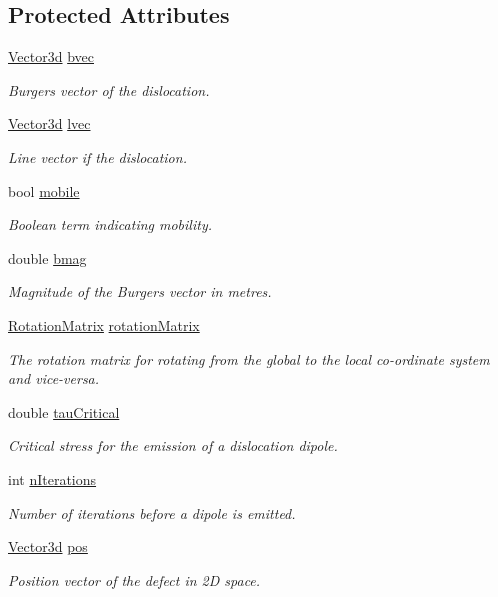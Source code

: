 \subsection*{Protected Attributes}
\begin{DoxyCompactItemize}
\item 
\hyperlink{classVector3d}{Vector3d} \hyperlink{classDislocationSource_ade4753ac6106317c693c2bba4f83a568}{bvec}
\begin{DoxyCompactList}\small\item\em Burgers vector of the dislocation. \end{DoxyCompactList}\item 
\hyperlink{classVector3d}{Vector3d} \hyperlink{classDislocationSource_a6a1ab6dc549236d2335a200e601781ea}{lvec}
\begin{DoxyCompactList}\small\item\em Line vector if the dislocation. \end{DoxyCompactList}\item 
bool \hyperlink{classDislocationSource_a7cfb4fd64ac4da8c79398b6e2c732875}{mobile}
\begin{DoxyCompactList}\small\item\em Boolean term indicating mobility. \end{DoxyCompactList}\item 
double \hyperlink{classDislocationSource_a59c95f3cb5af5180d2c42792413f7816}{bmag}
\begin{DoxyCompactList}\small\item\em Magnitude of the Burgers vector in metres. \end{DoxyCompactList}\item 
\hyperlink{classRotationMatrix}{Rotation\-Matrix} \hyperlink{classDislocationSource_a3bb826a0646d5c5546045cbf8d523b4f}{rotation\-Matrix}
\begin{DoxyCompactList}\small\item\em The rotation matrix for rotating from the global to the local co-\/ordinate system and vice-\/versa. \end{DoxyCompactList}\item 
double \hyperlink{classDislocationSource_ad91294a3ab5b6f6156a2ad67b9df954e}{tau\-Critical}
\begin{DoxyCompactList}\small\item\em Critical stress for the emission of a dislocation dipole. \end{DoxyCompactList}\item 
int \hyperlink{classDislocationSource_aacf42c7505f28b50280b23b435024e17}{n\-Iterations}
\begin{DoxyCompactList}\small\item\em Number of iterations before a dipole is emitted. \end{DoxyCompactList}\item 
\hyperlink{classVector3d}{Vector3d} \hyperlink{classDefect_aed2731c1beefc22e3db6ad5b18194cdd}{pos}
\begin{DoxyCompactList}\small\item\em Position vector of the defect in 2\-D space. \end{DoxyCompactList}\end{DoxyCompactItemize}


